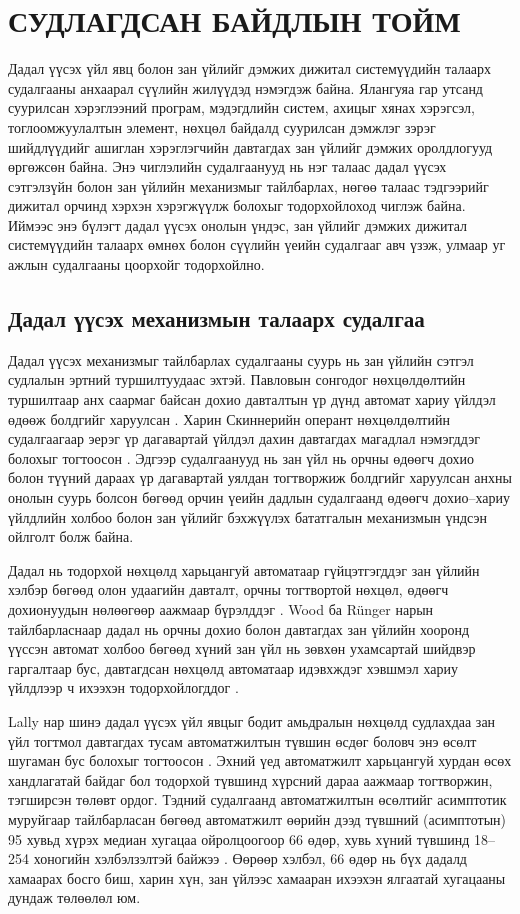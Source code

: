 ﻿\chapter{СУДЛАГДСАН БАЙДЛЫН ТОЙМ}

Дадал үүсэх үйл явц болон зан үйлийг дэмжих дижитал системүүдийн талаарх судалгааны анхаарал сүүлийн жилүүдэд нэмэгдэж байна. Ялангуяа гар утсанд суурилсан хэрэглээний програм, мэдэгдлийн систем, ахицыг хянах хэрэгсэл, тоглоомжуулалтын элемент, нөхцөл байдалд суурилсан дэмжлэг зэрэг шийдлүүдийг ашиглан хэрэглэгчийн давтагдах зан үйлийг дэмжих оролдлогууд өргөжсөн байна. Энэ чиглэлийн судалгаанууд нь нэг талаас дадал үүсэх сэтгэлзүйн болон зан үйлийн механизмыг тайлбарлах, нөгөө талаас тэдгээрийг дижитал орчинд хэрхэн хэрэгжүүлж болохыг тодорхойлоход чиглэж байна. Иймээс энэ бүлэгт дадал үүсэх онолын үндэс, зан үйлийг дэмжих дижитал системүүдийн талаарх өмнөх болон сүүлийн үеийн судалгааг авч үзэж, улмаар уг ажлын судалгааны цоорхойг тодорхойлно.

\section{Дадал үүсэх механизмын талаарх судалгаа}

Дадал үүсэх механизмыг тайлбарлах судалгааны суурь нь зан үйлийн сэтгэл судлалын эртний туршилтуудаас эхтэй. Павловын сонгодог нөхцөлдөлтийн туршилтаар анх саармаг байсан дохио давталтын үр дүнд автомат хариу үйлдэл өдөөж болдгийг харуулсан \cite{pavlov1927}. Харин Скиннерийн оперант нөхцөлдөлтийн судалгаагаар эерэг үр дагавартай үйлдэл дахин давтагдах магадлал нэмэгддэг болохыг тогтоосон \cite{skinner1938}. Эдгээр судалгаанууд нь зан үйл нь орчны өдөөгч дохио болон түүний дараах үр дагавартай уялдан тогтворжиж болдгийг харуулсан анхны онолын суурь болсон бөгөөд орчин үеийн дадлын судалгаанд өдөөгч дохио--хариу үйлдлийн холбоо болон зан үйлийг бэхжүүлэх бататгалын механизмын үндсэн ойлголт болж байна.

Дадал нь тодорхой нөхцөлд харьцангуй автоматаар гүйцэтгэгддэг зан үйлийн хэлбэр бөгөөд олон удаагийн давталт, орчны тогтвортой нөхцөл, өдөөгч дохионуудын нөлөөгөөр аажмаар бүрэлддэг \cite{ref1}. Wood ба R\"unger нарын тайлбарласнаар дадал нь орчны дохио болон давтагдах зан үйлийн хооронд үүссэн автомат холбоо бөгөөд хүний зан үйл нь зөвхөн ухамсартай шийдвэр гаргалтаар бус, давтагдсан нөхцөлд автоматаар идэвхждэг хэвшмэл хариу үйлдлээр ч ихээхэн тодорхойлогддог \cite{ref1}.

Lally нар шинэ дадал үүсэх үйл явцыг бодит амьдралын нөхцөлд судлахдаа зан үйл тогтмол давтагдах тусам автоматжилтын түвшин өсдөг боловч энэ өсөлт шугаман бус болохыг тогтоосон \cite{ref6}. Эхний үед автоматжилт харьцангуй хурдан өсөх хандлагатай байдаг бол тодорхой түвшинд хүрсний дараа аажмаар тогтворжин, тэгширсэн төлөвт ордог. Тэдний судалгаанд автоматжилтын өсөлтийг асимптотик муруйгаар тайлбарласан бөгөөд автоматжилт өөрийн дээд түвшний (асимптотын) 95 хувьд хүрэх медиан хугацаа ойролцоогоор 66 өдөр, хувь хүний түвшинд 18--254 хоногийн хэлбэлзэлтэй байжээ \cite{ref6}. Өөрөөр хэлбэл, 66 өдөр нь бүх дадалд хамаарах босго биш, харин хүн, зан үйлээс хамааран ихээхэн ялгаатай хугацааны дундаж төлөөлөл юм.

